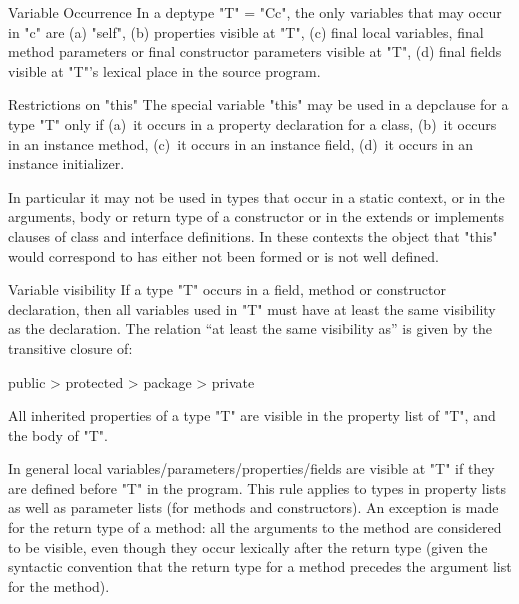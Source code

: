\begin{staticrule}{Variable Occurrence}
In a deptype \xcd"T" = \xcd"C{c}", the only variables that may
occur in \xcd"c" are (a)
\xcd"self", (b) properties visible at \xcd"T", (c) final local variables, final
method parameters or final constructor parameters visible at \xcd"T", (d)
final fields visible at \xcd"T"'s lexical place in the source program.  
\end{staticrule}

\begin{staticrule}{Restrictions on \xcd"this"}
  The special variable \xcd"this" may be used in a depclause for a type \xcd"T"
  only if (a)~it occurs in a property declaration for a class, (b)~it
  occurs in an instance method, (c)~it occurs in an instance field, (d)~it
  occurs in an instance initializer.
\end{staticrule}

In particular it may not be used in types that occur in a static
context, or in the arguments, body or return type of a constructor or
in the extends or implements clauses of class and interface
definitions.  In these contexts the object that \xcd"this" would
correspond to has either not been formed or is not well defined.

\begin{staticrule}{Variable visibility}
  If a type \xcd"T" occurs in a field, method or constructor
  declaration, then all variables used in \xcd"T" must have at least the
  same visibility as the declaration.  The relation ``at least the same
  visibility as'' is given by the transitive closure of:

\begin{xten}
public > protected > package > private
\end{xten}

All inherited properties of a type \xcd"T" are visible in the property
list of \xcd"T", and the body of \xcd"T".

\end{staticrule}

In general local variables/parameters/properties/fields are visible at
\xcd"T" if they are defined before \xcd"T" in the program. This rule applies to
types in property lists as well as parameter lists (for methods and
constructors).  An exception is made for the return type of a method:
all the arguments to the method are considered to be visible, even
though they occur lexically after the return type (given the \Java{}
syntactic convention that the return type for a method precedes the
argument list for the method).

